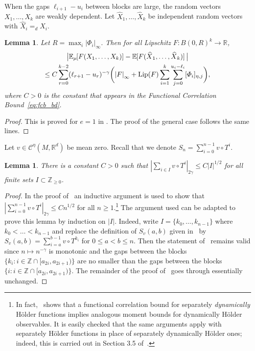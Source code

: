 \documentclass[11pt,a4paper,reqno,oneside]{amsart}
\newcommand{\Z}{\ensuremath{\mathbb{Z}}}%
\newcommand{\R}{\ensuremath{\mathbb{R}}}%
\newcommand{\pnorm}[1]{\left|#1\right|}
\newcommand{\norminf}[1]{\left|#1\right|_\infty}
\newcommand{\eqd}{=_d}
\newcommand{\holsp}[1][\eta]{\mathcal{C}^{#1}}
\newcommand{\Ex}[2][]{\mathbb{E}_{#1\!\!}\left[#2\right]}
\newcommand{\Lip}{\mathrm{Lip}}
\newcommand{\shat}[1]{\vphantom{#1}\smash[t]{\widehat{#1}}}
\newcommand{\sdsemi}[2]{[#1]_{\eta,#2}}
\newtheorem{lemma}[theorem]{Lemma}
\theoremstyle{definition}
\theoremstyle{remark}
\numberwithin{equation}{section}
\begin{document}
	When the gaps $\ell_{i+1}-u_i$ between blocks are large, the random vectors $ X_1,\dots,X_k $ are weakly dependent. Let $\widehat{X}_1,\dots,\widehat{X}_k$ be independent random vectors with $\widehat{X}_i{\eqd X_i}$.
	\begin{lemma}\label{lemma:weak_dependence}
		Let $R=\max_i \norminf{\varPhi_i}$. Then for all Lipschitz $ F:B(0,R)^k\to \R $,
		\begin{multline*}
			\big|\Ex[\mu]{F(X_1,\dots,X_{k})}-\Ex{F(\shat{X}_1,\dots,\shat{X}_{k})}\big|\\
			\le C\sum_{r=0}^{k-2}(\ell_{r+1}-u_r)^{-\gamma}\biggl(\norminf{F}+\Lip(F)\sum_{i=1}^{k}\sum_{j=0}^{u_i-\ell_i}\sdsemi{\varPhi_i}{j}\biggr),
		\end{multline*}
		where $C>0$ is the constant that appears in the Functional Correlation Bound~\eqref{eq:fcb_bd}.
	\end{lemma}
	\begin{proof}
		This is proved for $e = 1$ in \cite[Lemma 4.1]{fleming2022}. The proof of the general case
		follows the same lines.
	\end{proof}
	Let $v\in \holsp(M,\R^d)$ be mean zero. Recall that we denote $S_n = \sum_{i=0}^{n-1}v\circ T^i$.
	\begin{lemma}\label{lem:moment_bds_arbitrary_set}
		There is a constant $C>0$ such that $\pnorm{\sum_{i\in I}v\circ T^i}_{2\gamma}\le C |I|^{1/2}$ for all finite sets $I\subset \Z_{\ge 0}$.
	\end{lemma}
	\begin{proof}In the proof of~\cite[Theorem 2.4(a)]{fleming2022} an inductive argument is used to show that $\pnorm{\sum_{i=0}^{n-1}v\circ T^i}_{2\gamma}\le Cn^{1/2}$ for all $n\ge 1$.\footnote{In fact,~\cite{fleming2022} shows that a functional correlation bound for separately \textit{dynamically} H\"older functions implies analogous moment bounds for dynamically H\"older observables. It is easily checked that the same arguments apply with separately H\"older functions in place of separately dynamically H\"older ones; indeed, this is carried out in Section 3.5 of~\cite{my_thesis}.} The argument used can be adapted to prove this lemma by induction on $|I|$. Indeed, write $I = \{k_0,\dots,k_{n-1}\}$ where $k_0<\dots<k_{n-1}$ and replace the definition of $S_v(a,b)$ given in~\cite[Section 5]{fleming2022} by \( S_v(a,b) = \sum_{i=a}^{b-1} v\circ T^{k_i} \) for $0\le a<b\le n$. Then the statement of~\cite[Lemma 5.4]{fleming2022} remains valid since $n\mapsto n^{-\gamma}$ is monotonic and the gaps between the blocks $\{k_i:i\in \Z\cap[a_{2i},a_{2i+1})\}$ are no smaller than the gaps between the blocks $\{i: i \in \Z\cap[a_{2i},a_{2i+1})\}$. The remainder of the proof of~\cite[Theorem 2.4(a)]{fleming2022} goes through essentially unchanged.
	\end{proof}
\end{document}
